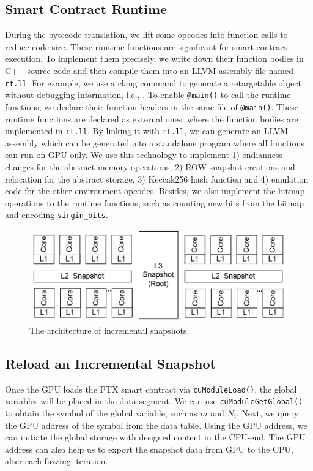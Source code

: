 \subsection{Smart Contract Runtime}
During the bytecode translation, we lift some opcodes into function calls to reduce code size. 
These runtime functions are significant for smart contract execution.
%
To implement them precisely, we write down their function bodies in C++ source code and then compile them into an LLVM assembly file named \texttt{rt.ll}. 
%
For example, we use a clang command to generate a retargetable object without debugging information, i.e., .
%
To enable \texttt{@main()} to call the runtime functions, we declare their function headers in the same file of \texttt{@main()}.
These runtime functions are declared as external ones, where the function bodies are implemented in \texttt{rt.ll}. 
%
By linking it with \texttt{rt.ll}, we can generate an LLVM assembly which can be generated into a standalone program where all functions can run on GPU only.
%
We use this technology to implement 1) endianness changes for the abstract memory operations, 2) ROW snapshot creations and relocation for the abstract storage, 3) Keccak256 hash function and 4) emulation code for the other environment opcodes. 
%
Besides, we also implement the bitmap operations to the runtime functions, such as counting new bits from the bitmap and encoding \texttt{virgin\_bits}.

\begin{figure}[!ht]
\centerline{\includegraphics[width=\columnwidth]{images/GFL-mem_layout.drawio.pdf}}
\caption{The architecture of incremental snapshots.}
\vspace{-0.1in}
\label{fig:snapshot}
\end{figure}

\subsection{Reload an Incremental Snapshot}
Once the GPU loads the PTX smart contract via \texttt{cuModuleLoad()}, the global variables will be placed in the data segment. 
We can use \texttt{cuModuleGetGlobal()} to obtain the symbol of the global variable, such as $m$ and $N_i$. 
Next, we query the GPU address of the symbol from  the data table. 
%
Using the GPU address, we can initiate the global storage with designed content in the CPU-end.
%
The GPU address can also help us to export the snapshot data from GPU to the CPU, after each fuzzing iteration.



